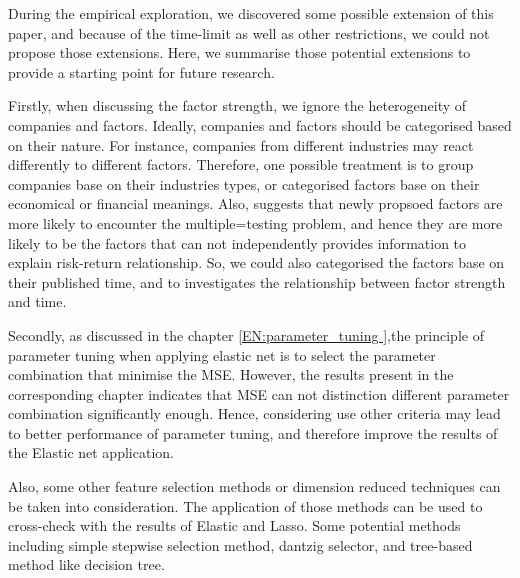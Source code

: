 During the empirical exploration, we discovered some possible extension of this paper, and because of the time-limit as well as other restrictions, we could not propose those extensions.
Here, we summarise those potential extensions to provide a starting point for future research.

Firstly, when discussing the factor strength, we ignore the heterogeneity of companies and factors.
Ideally, companies and factors should be categorised based on their nature.
For instance, companies from different industries may react differently to different factors.
Therefore, one possible treatment is to group companies base on their industries types, or categorised factors base on their economical or financial meanings.
Also,  suggests that newly propsoed factors are more likely to encounter the multiple=testing problem, and hence they are more likely to be the factors that can not independently provides information to explain risk-return relationship.
So, we could also categorised the factors base on their published time, and to investigates the relationship between factor strength and time.


Secondly, as discussed in the chapter \ref{EN:parameter_tuning },the principle of parameter tuning when applying elastic net is to select the parameter combination that minimise the MSE.
However, the results present in the corresponding chapter indicates that MSE can not distinction different parameter combination significantly enough.
Hence, considering use other criteria may lead to better performance of parameter tuning, and therefore improve the results of the Elastic net application.

Also, some other feature selection methods or dimension reduced techniques can be taken into consideration.
The application of those methods can be used to cross-check with the results of Elastic and Lasso.
Some potential methods including simple stepwise selection method, dantzig selector, and tree-based method like decision tree.

